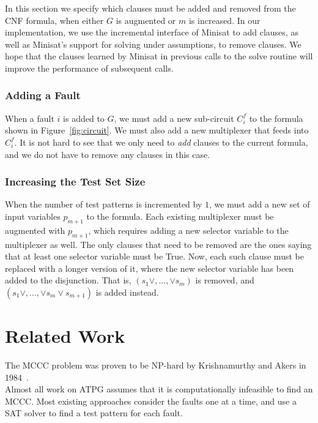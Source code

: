 \documentclass{article}
\newcommand{\MCCC}{\textsc{MCCC}\xspace}
\begin{document}
In this section we specify which clauses must be added and removed from the CNF formula, when either $G$ is augmented or $m$ is increased. In our implementation, we use the incremental interface of Minisat to add clauses, as well as Minisat's support for solving under assumptions, to remove clauses. We hope that the clauses learned by Minisat in previous calls to the solve routine will improve the performance of subsequent calls.\\

\subsubsection{Adding a Fault}
When a fault $i$ is added to $G$, we must add a new sub-circuit $C^f_i$ to the formula shown in Figure~\ref{fig:circuit}. We must also add a new multiplexer that feeds into $C^f_i$. It is not hard to see that we only need to \textit{add} clauses to the current formula, and we do not have to remove any clauses in this case. 
 
\subsubsection{Increasing the Test Set Size}           
When the number of test patterns is incremented by $1$, we must add a new set of input variables $p_{m+1}$ to the formula. Each existing multiplexer must be augmented with $p_{m+1}$, which requires adding a new selector variable to the multiplexer as well. The only clauses that need to be removed are the ones saying that at least one selector variable must be True. Now, each such clause must be replaced with a longer version of it, where the new selector variable has been added to the disjunction.  That is, $(s_1\vee,...,\vee s_m)$ is removed, and $(s_1\vee,...,\vee s_m \vee s_{m+1})$ is added instead.   

\section{Related Work}

The \MCCC problem was proven to be NP-hard by Krishnamurthy and Akers in 1984~\cite{Krishnamurthy:1984:CES:1907650.1907919}.\\

Almost all work on ATPG assumes that it is computationally infeasible to find an MCCC. Most existing approaches consider the faults one at a time, and  use a SAT solver to find a test pattern for each fault. \\
\end{document}
